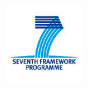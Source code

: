 \documentclass{fast_latex}
\begin{document}

\def\note#1{\marginpar{\footnotesize#1}} %


\newenvironment{definition}{}{}

\thispagestyle{empty}


\begin{flushright}
	\includegraphics[width=3cm]{images/FP7_logo}
\end{flushright}

\vspace{1cm}
\end{document}
